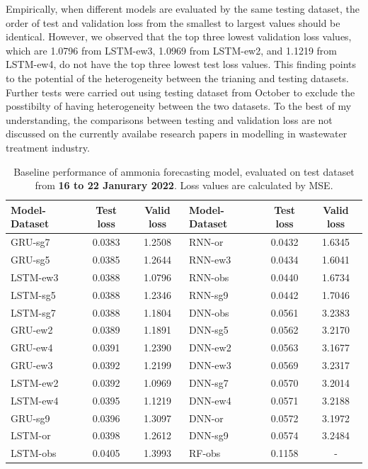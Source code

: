 Empirically, when different models are evaluated by the same testing dataset, the order of test and validation loss from the smallest to largest values should be identical. However, we observed that the top three lowest validation loss values, which are 1.0796 from LSTM-ew3, 1.0969 from LSTM-ew2, and 1.1219 from LSTM-ew4, do not have the top three lowest test loss values. This finding points to the potential of the heterogeneity between the trianing and testing datasets. Further tests were carried out using testing dataset from October to exclude the posstibilty of having heterogeneity between the two datasets. To the best of my understanding, the comparisons between testing and validation loss are not discussed on the currently availabe research papers in modelling in wastewater treatment industry.

\begin{table}[!ht]
  \centering
  \caption{Baseline performance of ammonia forecasting model, evaluated on test dataset from \textbf{16 to 22 Janurary 2022}. Loss values are calculated by MSE.}\label{tab:baseline-result-jan-nh3}
  \begin{NiceTabular}{lcclcc}
      \toprule
      Model-Dataset & Test loss & Valid loss & Model-Dataset & Test loss & Valid loss \\
      \midrule
      GRU-sg7  & 0.0383 &1.2508&RNN-or  & 0.0432&1.6345 \\
      GRU-sg5  & 0.0385 &1.2644&RNN-ew3 & 0.0434&1.6041 \\
      LSTM-ew3 & 0.0388 &1.0796&RNN-obs & 0.0440&1.6734 \\
      LSTM-sg5 & 0.0388 &1.2346&RNN-sg9 & 0.0442&1.7046 \\
      LSTM-sg7 & 0.0388 &1.1804&DNN-obs & 0.0561&3.2383 \\
      GRU-ew2  & 0.0389 &1.1891&DNN-sg5 & 0.0562&3.2170 \\
      GRU-ew4  & 0.0391 &1.2390&DNN-ew2 & 0.0563&3.1677 \\
      GRU-ew3  & 0.0392 &1.2199&DNN-ew3 & 0.0569&3.2317 \\
      LSTM-ew2 & 0.0392 &1.0969&DNN-sg7 & 0.0570&3.2014 \\
      LSTM-ew4 & 0.0395 &1.1219&DNN-ew4 & 0.0571&3.2188 \\
      GRU-sg9  & 0.0396 &1.3097&DNN-or  & 0.0572&3.1972 \\
      LSTM-or  & 0.0398 &1.2612&DNN-sg9 & 0.0574&3.2484 \\
      LSTM-obs & 0.0405 &1.3993&RF-obs  & 0.1158&- \\

\end{NiceTabular}
\end{table}
